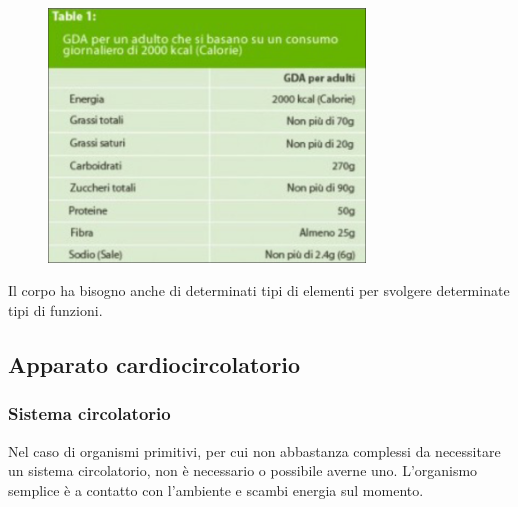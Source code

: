 \documentclass[a4paper]{article}
\begin{document}
\pagebreak

\begin{center}
\begin{figure}[th]
    \centering
    \includegraphics[width=0.75\textwidth]{./daily_intake.png}
\end{figure}
\end{center}

Il corpo ha bisogno anche di determinati tipi di elementi per svolgere determinate tipi di funzioni.


\pagebreak

\subsection{Apparato cardiocircolatorio}

\subsubsection{Sistema circolatorio}


Nel caso di organismi primitivi, per cui non abbastanza complessi da necessitare un sistema circolatorio,
non è necessario o possibile averne uno.
L'organismo semplice è a contatto con l'ambiente e scambi energia sul momento.
\end{document}
